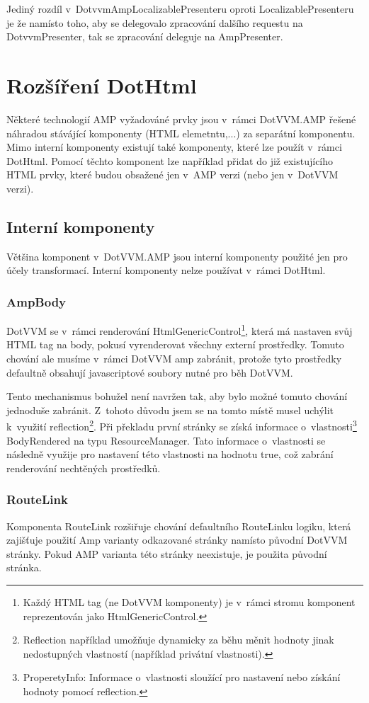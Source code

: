 Jediný rozdíl v~DotvvmAmpLocalizablePresenteru oproti LocalizablePresenteru je že namísto toho, aby se delegovalo zpracování dalšího requestu na DotvvmPresenter, tak se zpracování deleguje na AmpPresenter.

\section{Rozšíření DotHtml}

Některé technologií AMP vyžadováné prvky jsou v~rámci DotVVM.AMP řešené náhradou stávájící komponenty (HTML elemetntu,...) za separátní komponentu.  Mimo interní komponenty existují také komponenty, které lze použít v~rámci DotHtml. Pomocí těchto komponent lze například přidat do již existujícího HTML prvky, 
 které budou obsažené jen v~AMP verzi (nebo jen v~DotVVM verzi).
 
\subsection*{Interní komponenty}
Většina komponent v~DotVVM.AMP jsou interní komponenty použité jen pro účely transformací. Interní komponenty nelze používat v~rámci DotHtml.

\subsubsection*{AmpBody}
DotVVM se v~rámci renderování HtmlGenericControl\footnote{Každý HTML tag (ne DotVVM komponenty) je v~rámci stromu komponent reprezentován jako HtmlGenericControl.}, která má nastaven svůj HTML tag na body, pokusí vyrenderovat všechny externí prostředky. Tomuto chování ale musíme v~rámci DotVVM amp zabránit, protože tyto prostředky defaultně obsahují javascriptové soubory nutné pro běh DotVVM.

Tento mechanismus bohužel není navržen tak, aby bylo možné tomuto chování jednoduše zabránit. Z~tohoto důvodu jsem se na tomto místě musel uchýlit k~využití reflection\footnote{Reflection například umožňuje dynamicky za běhu měnit hodnoty jinak nedostupných vlastností (například privátní vlastnosti).}. Při překladu první stránky se získá informace o~vlastnosti\footnote{ProperetyInfo: Informace o~vlastnosti sloužící pro nastavení nebo získání hodnoty pomocí reflection.} BodyRendered na typu ResourceManager. Tato informace o~vlastnosti se následně využije pro nastavení této vlastnosti na hodnotu true, což zabrání renderování nechtěných prostředků.

\subsubsection*{RouteLink}
Komponenta RouteLink rozšiřuje chování defaultního RouteLinku logiku, která zajišťuje použití Amp varianty odkazované stránky namísto původní DotVVM stránky. Pokud AMP varianta této stránky neexistuje, je použita původní stránka.

